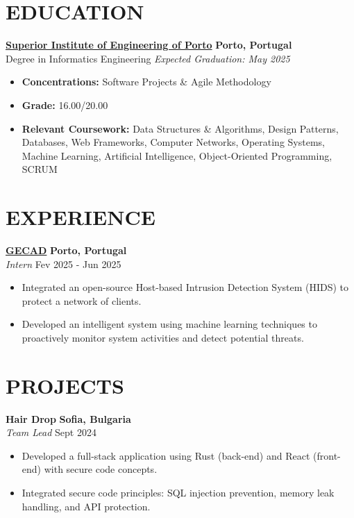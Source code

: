 \documentclass[10pt, letterpaper]{article}
\newenvironment{highlights}{
    \begin{itemize}[
        topsep=0.10 cm,
        parsep=0.10 cm,
        partopsep=0pt,
        itemsep=0pt,
        leftmargin=1cm %
    ]
}{
    \end{itemize}
}
\newenvironment{subhighlights}{
    \begin{itemize}[
        topsep=0.10 cm,
        parsep=0.10 cm,
        partopsep=0pt,
        itemsep=0pt,
        leftmargin=1.5cm, %
        label=$\vcenter{\hbox{\scriptsize$\circ$}}$ %
    ]
}{
    \end{itemize}
}
\begin{document}
\section{EDUCATION}
\textbf{\href{https://www.isep.ipp.pt}{Superior Institute of Engineering of Porto}} \hfill \textbf{Porto, Portugal} \\
Degree in Informatics Engineering \hfill \textit{Expected Graduation: May 2025} \\
\begin{subhighlights}
    \item \textbf{Concentrations:} Software Projects \& Agile Methodology
    \item \textbf{Grade:} 16.00/20.00
    \item \textbf{Relevant Coursework:} Data Structures \& Algorithms, Design Patterns, Databases, Web Frameworks, 
    Computer Networks, Operating Systems, Machine Learning, Artificial Intelligence, Object-Oriented Programming, SCRUM
\end{subhighlights}

\section{EXPERIENCE}
\textbf{\href{https://www.gecad.isep.ipp.pt/}{GECAD}} \hfill \textbf{Porto, Portugal} \\
\textit{Intern} \hfill Fev 2025 - Jun 2025 \\
\begin{highlights}

    \item Integrated an open-source Host-based Intrusion Detection System (HIDS) to protect a network of clients.

    \item Developed an intelligent system using machine learning techniques to proactively monitor system activities and detect potential threats.
\end{highlights}
\section{PROJECTS}
\textbf{Hair Drop} \hfill \textbf{Sofia, Bulgaria} \\
\textit{Team Lead} \hfill Sept 2024 \\
\begin{highlights}
    \item Developed a full-stack application using Rust (back-end) and React (front-end) with secure code concepts.
    \item Integrated secure code principles: SQL injection prevention, memory leak handling, and API protection.
\end{highlights}
\end{document}
